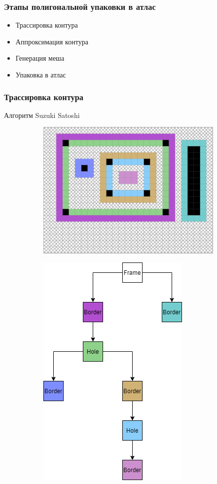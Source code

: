 \documentclass[10pt, unicode]{beamer}
\begin{document}
    \begin{frame}
        \frametitle{Этапы полигональной упаковки в атлас}
        \begin{itemize}
            \item Трассировка контура
            \item Аппроксимация контура
            \item Генерация меша
            \item Упаковка в атлас
        \end{itemize}
    \end{frame}
    \begin{frame}
        \frametitle{Трассировка контура}
        Алгоритм Suzuki Satoshi %
        \begin{figure}[H]
            \centering
            \begin{subfigure}[t]{.49\linewidth}
                \includegraphics[scale=0.25]{images/SuzukiExample_contours_upscaled.png}
            \end{subfigure}
            \begin{subfigure}[t]{.49\linewidth}
                \centering
                \includegraphics[scale=0.4]{images/SuzukiExample_hierarchy.png}

\end{subfigure}
\end{figure}
\end{frame}
\end{document}
